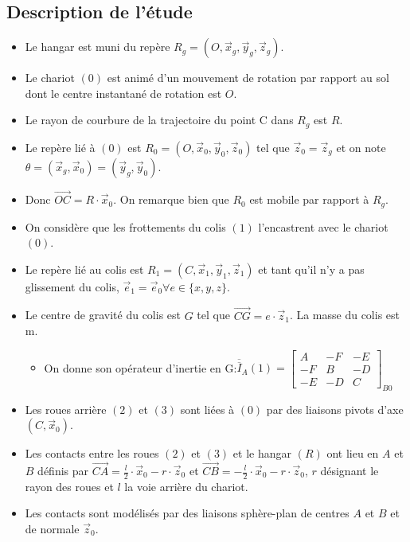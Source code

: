 \subsection{Description de l'étude}
\begin{itemize}
	\item Le hangar est muni du repère $R_g = (O,\vec x_g, \vec y_g, \vec z_g)$.
	\item Le chariot $(0)$ est animé d'un mouvement de rotation par rapport au sol dont le centre instantané de rotation est $O$.
	\item Le rayon de courbure de la trajectoire du point C dans $R_g$ est $R$.
	\item Le repère lié à $(0)$ est $R_0 = (O, \vec x_0, \vec y_0, \vec z_0)$ tel que $\vec z_0 = \vec z_g$ et on note $\theta = (\vec x_g, \vec x_0) = (\vec y_g, \vec y_0)$.
	\item Donc $\vec{OC} = R \cdot \vec x_0$. On remarque bien que $R_0$ est mobile par rapport à $R_g$.
	\item On considère que les frottements du colis $(1)$ l'encastrent avec le chariot $(0)$.
	\item Le repère lié au colis est $R_1 = (C, \vec x_1, \vec y_1, \vec z_1)$ et tant qu'il n'y a pas glissement du colis, $\vec e_1 = \vec e_0 \forall e \in \{x,y,z\}$.
	\item Le centre de gravité du colis est $G$ tel que $\vec{CG} = e\cdot\vec z_1$. La masse du colis est m.
		\begin{itemize}
			\item On donne son opérateur d'inertie en G:$\overline{\overline{I}}_A(1) = \left[ \begin{array}{ccc}
					A & -F & -E \\
					-F & B & -D \\
					-E & -D & C
			\end{array} \right]_{B0}$
		\end{itemize}
	\item Les roues arrière $(2)$ et $(3)$ sont liées à $(0)$ par des liaisons pivots d'axe $(C, \vec x_0)$.
	\item Les contacts entre les roues $(2)$ et $(3)$ et le hangar $(R)$ ont lieu en $A$ et $B$ définis par $\vec{CA} = \frac{l}{2} \cdot \vec x_0 - r\cdot \vec z_0$ et $\vec{CB} = -\frac{l}{2} \cdot \vec x_0 - r\cdot \vec z_0$, $r$ désignant le rayon des roues et $l$ la voie arrière du chariot.
	\item Les contacts sont modélisés par des liaisons sphère-plan de centres $A$ et $B$ et de normale $\vec z_0$.

\end{itemize}
